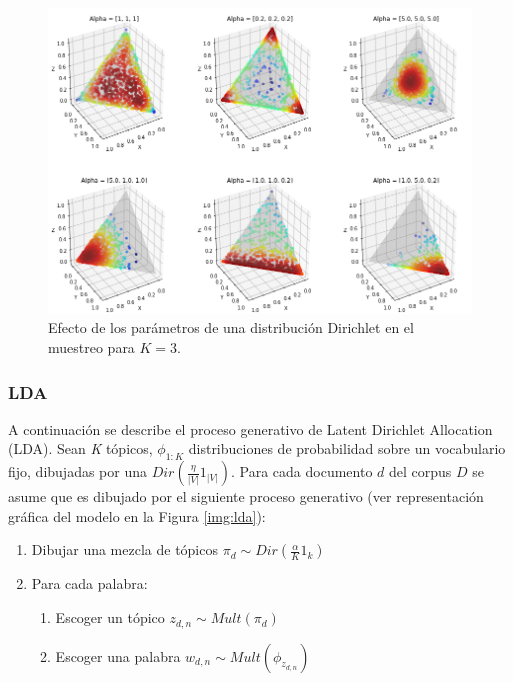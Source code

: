 \documentclass[letterpaper,12pt,oneside]{book} %
\begin{document}
\begin{figure}
    \centering
    \includegraphics[width=1\textwidth]{img/math/dirichlet_distribution.png}
    \caption{Efecto de los parámetros de una distribución Dirichlet en el muestreo para $K=3$.}
    \label{img:dirichlet_distribution}
\end{figure}

\subsubsection{LDA}
A continuación se describe el proceso generativo de Latent Dirichlet Allocation (LDA). Sean \textit{K} tópicos, $\phi_{1:K}$ distribuciones de probabilidad sobre un vocabulario fijo, dibujadas por una $Dir(\frac{\eta}{|V|}1_{|V|})$. Para cada documento $d$ del corpus $D$ se asume que es dibujado por el siguiente proceso generativo (ver representación gráfica del modelo en la Figura \ref{img:lda}):
\begin{enumerate}
    \item Dibujar una mezcla de tópicos $\pi_{d}\sim Dir(\frac{\alpha}{K}1_{k})$
    \item Para cada palabra:
    \begin{enumerate}
        \item Escoger un tópico $z_{d,n}\sim Mult(\pi_{d})$
        \item Escoger una palabra $w_{d,n}\sim Mult(\phi_{z_{d,n}})$
    \end{enumerate}
\end{enumerate}
\end{document}
